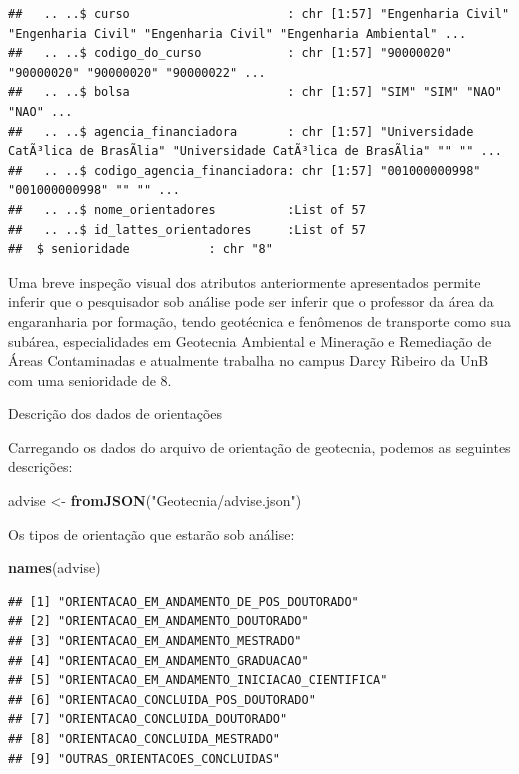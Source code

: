 \documentclass[]{article}
\newenvironment{Shaded}{\begin{snugshade}}{\end{snugshade}}
\newcommand{\KeywordTok}[1]{\textcolor[rgb]{0.13,0.29,0.53}{\textbf{#1}}}
\newcommand{\NormalTok}[1]{#1}
\newcommand{\StringTok}[1]{\textcolor[rgb]{0.31,0.60,0.02}{#1}}
\begin{document}
\begin{verbatim}
##   .. ..$ curso                      : chr [1:57] "Engenharia Civil" "Engenharia Civil" "Engenharia Civil" "Engenharia Ambiental" ...
##   .. ..$ codigo_do_curso            : chr [1:57] "90000020" "90000020" "90000020" "90000022" ...
##   .. ..$ bolsa                      : chr [1:57] "SIM" "SIM" "NAO" "NAO" ...
##   .. ..$ agencia_financiadora       : chr [1:57] "Universidade CatÃ³lica de BrasÃ­lia" "Universidade CatÃ³lica de BrasÃ­lia" "" "" ...
##   .. ..$ codigo_agencia_financiadora: chr [1:57] "001000000998" "001000000998" "" "" ...
##   .. ..$ nome_orientadores          :List of 57
##   .. ..$ id_lattes_orientadores     :List of 57
##  $ senioridade           : chr "8"
\end{verbatim}

Uma breve inspeção visual dos atributos anteriormente apresentados
permite inferir que o pesquisador sob análise pode ser inferir que o
professor da área da engaranharia por formação, tendo geotécnica e
fenômenos de transporte como sua subárea, especialidades em Geotecnia
Ambiental e Mineração e Remediação de Áreas Contaminadas e atualmente
trabalha no campus Darcy Ribeiro da UnB com uma senioridade de 8.

Descrição dos dados de orientações

Carregando os dados do arquivo de orientação de geotecnia, podemos as
seguintes descrições:

\begin{Shaded}
\begin{Highlighting}[]
\NormalTok{advise <-}\StringTok{ }\KeywordTok{fromJSON}\NormalTok{(}\StringTok{"Geotecnia/advise.json"}\NormalTok{)}
\end{Highlighting}
\end{Shaded}

Os tipos de orientação que estarão sob análise:

\begin{Shaded}
\begin{Highlighting}[]
\KeywordTok{names}\NormalTok{(advise)}
\end{Highlighting}
\end{Shaded}

\begin{verbatim}
## [1] "ORIENTACAO_EM_ANDAMENTO_DE_POS_DOUTORADO"    
## [2] "ORIENTACAO_EM_ANDAMENTO_DOUTORADO"           
## [3] "ORIENTACAO_EM_ANDAMENTO_MESTRADO"            
## [4] "ORIENTACAO_EM_ANDAMENTO_GRADUACAO"           
## [5] "ORIENTACAO_EM_ANDAMENTO_INICIACAO_CIENTIFICA"
## [6] "ORIENTACAO_CONCLUIDA_POS_DOUTORADO"          
## [7] "ORIENTACAO_CONCLUIDA_DOUTORADO"              
## [8] "ORIENTACAO_CONCLUIDA_MESTRADO"               
## [9] "OUTRAS_ORIENTACOES_CONCLUIDAS"
\end{verbatim}
\end{document}
